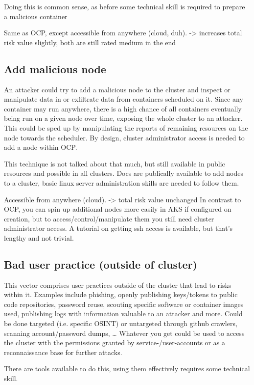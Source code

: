 Doing this is common sense, as before some technical skill is required to prepare a malicious container

Same as OCP, except accessible from anywhere (cloud, duh).
-> increases total risk value slightly, both are still rated medium in the end

\subsection{Add malicious node}
An attacker could try to add a malicious node to the cluster and inspect or manipulate data in or exfiltrate data from containers scheduled on it. Since any container may run anywhere, there is a high chance of all containers eventually being run on a given node over time, exposing the whole cluster to an attacker. This could be sped up by manipulating the reports of remaining resources on the node towards the scheduler.
By design, cluster administrator access is needed to add a node within OCP.

This technique is not talked about that much, but still available in public resources and possible in all clusters. Docs are publically available to add nodes to a cluster, basic linux server administration skills are needed to follow them.

Accessible from anywhere (cloud).
-> total risk value unchanged
In contrast to OCP, you can spin up additional nodes more easily in AKS if configured on creation, but to access/control/manipulate them you still need cluster administrator access.
A tutorial on getting ssh access is available, but that’s lengthy and not trivial.

\subsection{Bad user practice (outside of cluster)}
This vector comprises user practices outside of the cluster that lead to risks within it. Examples include phishing, openly publishing keys/tokens to public code repositories, password reuse, scouting specific software or container images used, publishing logs with information valuable to an attacker and more.
Could be done targeted (i.e. specific OSINT) or untargeted through github crawlers, scanning account/password dumps, …
Whatever you get could be used to access the cluster with the permissions granted by service-/user-accounts or as a reconnaissance base for further attacks.

There are tools available to do this, using them effectively requires some technical skill.

